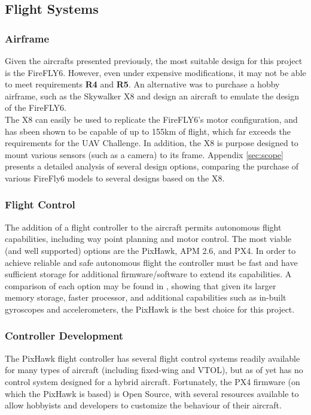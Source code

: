 \subsection{Flight Systems}
\subsubsection*{Airframe}
Given the aircrafts presented previously, the most suitable design for this project is the FireFLY6. However, even under expensive modifications, it may not be able to meet requirements \textbf{R4} and \textbf{R5}. An alternative was to purchase a hobby airframe, such as the Skywalker X8\cite{ref:x8} and design an aircraft to emulate the design of the FireFLY6.\\

The X8 can easily be used to replicate the FireFLY6's motor configuration, and has sbeen shown to be capable of up to 155km of flight\cite{ref:range}, which far exceeds the requirements for the UAV Challenge. In addition, the X8 is purpose designed to mount various sensors (such as a camera) to its frame. Appendix \ref{sec:scope} presents a detailed analysis of several design options, comparing the purchase of various FireFly6 models to several designs based on the X8.

\subsubsection*{Flight Control}
The addition of a flight controller to the aircraft permits autonomous flight capabilities, including way point planning and motor control. The most viable (and well supported) options are the PixHawk\cite{ref:pixhawk}, APM 2.6\cite{ref:ardupilot}, and PX4\cite{ref:px4}. In order to achieve reliable and safe autonomous flight the controller must be fast and have sufficient storage for additional firmware/software to extend its capabilities. A comparison of each option may be found in \cite{ref:controller_comparison}, showing that given its larger memory storage, faster processor, and additional capabilities such as in-built gyroscopes and accelerometers, the PixHawk is the best choice for this project.

\subsubsection*{Controller Development}
The PixHawk flight controller has several flight control systems readily available for many types of aircraft (including fixed-wing and VTOL), but as of yet has no control system designed for a hybrid aircraft. Fortunately, the PX4 firmware (on which the PixHawk is based) is Open Source\cite{ref:ardupilotgit}, with several resources available\cite{ref:firmware1,ref:firmware2} to allow hobbyists and developers to customize the behaviour of their aircraft.

